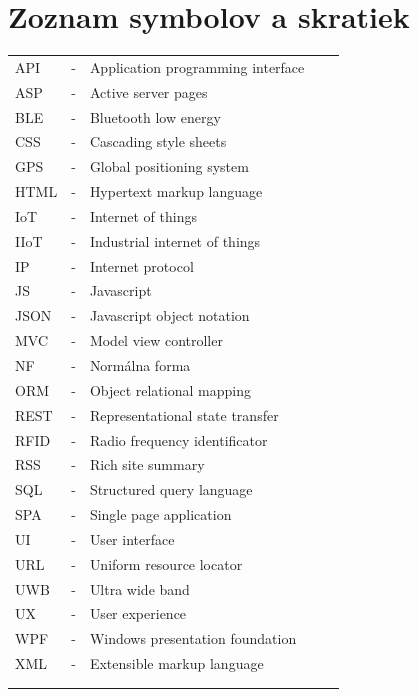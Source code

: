 \documentclass[11pt, oneside]{report}
\begin{document}


\newpage 
\setcounter{page}{7}
\tableofcontents



\newpage

\chapter*{ Zoznam symbolov a skratiek }
\begin{table}[H]
\label{my-label}
\begin{tabular}{lllll}
API  & - &  Application programming interface &  &  \\
ASP&- & Active server pages  &  &  \\
BLE & - &  Bluetooth low energy &  &  \\
CSS & - &  Cascading style sheets &  &  \\
GPS  & - &  Global positioning system &  &  \\
HTML & - &  Hypertext markup language&  &  \\
IoT   & - & Internet of things  &  &  \\
IIoT   & - & Industrial internet of things  &  &  \\
IP  & - &  Internet protocol &  &  \\
JS   & - & Javascript  &  &  \\
JSON & - & Javascript object notation &  &  \\
MVC  & - &  Model view controller &  &  \\
NF & - &  Normálna forma &  &  \\
ORM & - &  Object relational mapping &  &  \\
REST & - & Representational state transfer&  &  \\
RFID & - &  Radio frequency identificator &  &  \\
RSS & - &  Rich site summary &  &  \\
SQL  & - &  Structured query language&  &  \\
SPA  & - &  Single page application&  &  \\
UI  & - &  User interface &  &  \\
URL  & - &  Uniform resource locator &  &  \\
UWB  & - &  Ultra wide band &  &  \\
UX  & - &  User experience &  &  \\
WPF & - &  Windows presentation foundation &  &  \\
XML  & - &  Extensible markup language &  &  \\
 &  &  &  &  \\
 &  &  &  & 
\end{tabular}
\end{table}
\newpage 
\end{document}
